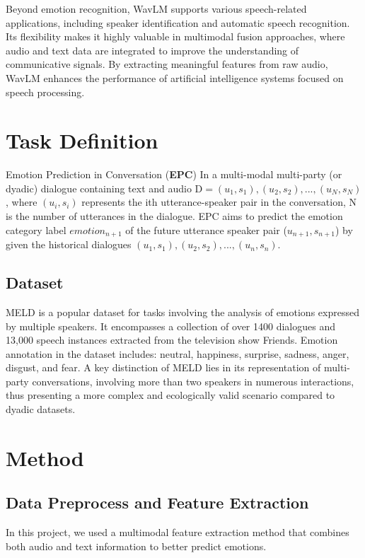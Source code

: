 \documentclass{article}
\begin{document}
Beyond emotion recognition, WavLM supports various speech-related applications, including speaker identification and automatic speech recognition. Its flexibility makes it highly valuable in multimodal fusion approaches, where audio and text data are integrated to improve the understanding of communicative signals. By extracting meaningful features from raw audio, WavLM enhances the performance of artificial intelligence systems focused on speech processing.


\section{ Task Definition}
Emotion Prediction in Conversation (\textbf{EPC}) In a multi-modal
multi-party (or dyadic) dialogue containing text and audio
$\mathrm{D} = {(u_1, s_1), (u_2, s_2), ..., (u_N, s_N)}$, where $(u_i, s_i)$ represents
the ith utterance-speaker pair in the conversation, N is
the number of utterances in the dialogue. EPC aims to predict
the emotion category label $emotion_{n+1}$ of the future utterance
speaker pair ($u_{n+1}, s_{n+1}$) by given the historical dialogues
${(u_1, s_1), (u_2, s_2), ..., (u_n, s_n)}$.

\subsection{Dataset}
MELD is a popular dataset for tasks involving the analysis of emotions expressed by multiple speakers. It encompasses a collection of over 1400 dialogues and 13,000 speech instances extracted from the television show
Friends. Emotion annotation in the dataset includes: neutral, happiness, surprise, sadness, anger, disgust, and fear.
A key distinction of MELD lies in its representation of multi-party conversations, involving more than two speakers in numerous interactions, thus presenting a more complex and ecologically valid scenario compared to dyadic datasets. 

\section{Method}
\subsection{Data Preprocess and Feature Extraction}

In this project, we used a multimodal feature extraction method that combines both audio and text information to better predict emotions.
\end{document}
